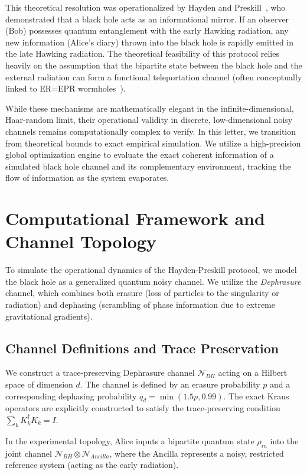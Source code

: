 \documentclass[twocolumn,prl,aps,floatfix]{revtex4-2}
\begin{document}
This theoretical resolution was operationalized by Hayden and Preskill~\cite{HaydenPreskill2007}, who demonstrated that a black hole acts as an informational mirror. If an observer (Bob) possesses quantum entanglement with the early Hawking radiation, any new information (Alice's diary) thrown into the black hole is rapidly emitted in the late Hawking radiation. The theoretical feasibility of this protocol relies heavily on the assumption that the bipartite state between the black hole and the external radiation can form a functional teleportation channel (often conceptually linked to ER=EPR wormholes~\cite{Susskind2013}).

While these mechanisms are mathematically elegant in the infinite-dimensional, Haar-random limit, their operational validity in discrete, low-dimensional noisy channels remains computationally complex to verify. In this letter, we transition from theoretical bounds to exact empirical simulation. We utilize a high-precision global optimization engine to evaluate the exact coherent information of a simulated black hole channel and its complementary environment, tracking the flow of information as the system evaporates.

\section{Computational Framework and Channel Topology}

To simulate the operational dynamics of the Hayden-Preskill protocol, we model the black hole as a generalized quantum noisy channel. We utilize the \emph{Dephrasure} channel, which combines both erasure (loss of particles to the singularity or radiation) and dephasing (scrambling of phase information due to extreme gravitational gradients).

\subsection{Channel Definitions and Trace Preservation}
We construct a trace-preserving Dephrasure channel $\mathcal{N}_{BH}$ acting on a Hilbert space of dimension $d$. The channel is defined by an erasure probability $p$ and a corresponding dephasing probability $q_d = \min(1.5p, 0.99)$. The exact Kraus operators are explicitly constructed to satisfy the trace-preserving condition $\sum_k K_k^\dagger K_k = I$. 

In the experimental topology, Alice inputs a bipartite quantum state $\rho_{in}$ into the joint channel $\mathcal{N}_{BH} \otimes \mathcal{N}_{Ancilla}$, where the Ancilla represents a noisy, restricted reference system (acting as the early radiation). 
\end{document}
